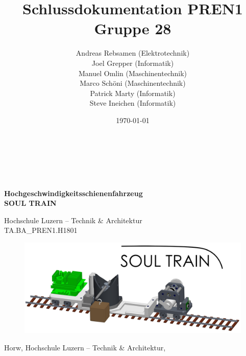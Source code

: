 \documentclass[11pt]{scrartcl}
\title{Schlussdokumentation PREN1 Gruppe 28}
\author{Andreas Rebsamen (Elektrotechnik) \\Joel Grepper (Informatik)\\ Manuel Omlin (Maschinentechnik)\\ Marco Schöni (Maschinentechnik)\\ Patrick Marty (Informatik)\\ Steve Ineichen (Informatik)}
\date{\today{}}
\begin{document}
        \begin{titlingpage}
            \begin{flushleft}
                \begin{Huge} %
                    \textbf{\thetitle} \\
                \end{Huge}
                \vspace{1.5cm}
                \begin{large} %
                    \theauthor \\
                \end{large}
                \vspace{1.5cm}
                \begin{huge}
                    \textbf{Hochgeschwindigkeitsschienenfahrzeug}\\
                    \textbf{SOUL TRAIN}\\
                \end{huge}
                \vspace{0.5cm}
                \begin{large}
                    Hochschule Luzern – Technik \& Architektur\\
                    TA.BA{\_}PREN1.H1801
                \end{large}
                \vspace{1.5cm}
                \begin{figure}[H] %
                    \centering
                    \includegraphics[width=1\textwidth]{images/soultrain.png}
                \end{figure}
                \vspace{3cm}
                \begin{large} %
                    Horw, Hochschule Luzern – Technik \& Architektur, \thedate
                \end{large}
            \end{flushleft}
        \end{titlingpage}
\end{document}
